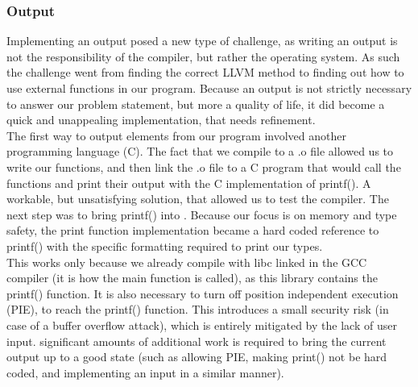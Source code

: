 \subsubsection{Output}
\label{sec:Output}
Implementing an output posed a new type of challenge, as writing an output is not the responsibility of the compiler, but rather the operating system. As such the challenge went from finding the correct LLVM method to finding out how to use external functions in our program. Because an output is not strictly necessary to answer our problem statement, but more a quality of life, it did become a quick and unappealing implementation, that needs refinement.\\
The first way to output elements from our  program involved another programming language (C). The fact that we compile to a .o file allowed us to write our functions, and then link the .o file to a C program that would call the \lang{} functions and print their output with the C implementation of printf(). A workable, but unsatisfying solution, that allowed us to test the compiler. The next step was to bring printf() into \lang. Because our focus is on memory and type safety, the print function implementation became a hard coded reference to printf() with the specific formatting required to print our types.\\
This works only because we already compile with libc linked in the GCC compiler (it is how the main function is called), as this library contains the printf() function. It is also necessary to turn off position independent execution (PIE), to reach the printf() function. This introduces a small security risk (in case of a buffer overflow attack), which is entirely mitigated by the lack of user input. significant amounts of additional work is required to bring the current output up to a good state (such as allowing PIE, making print() not be hard coded, and implementing an input in a similar manner).

